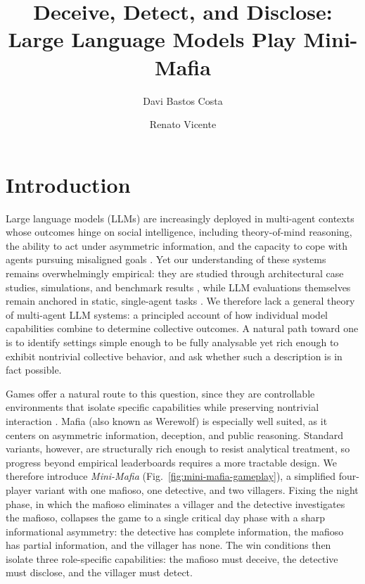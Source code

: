 \documentclass[sigconf]{aamas}
\title{Deceive, Detect, and Disclose: \\ Large Language Models Play Mini-Mafia}
\author{Davi Bastos Costa}
\author{Renato Vicente}
\affiliation{%
  \institution{Center for Artificial Intelligence and Machine Learning, IME, University of S\~ao Paulo}
  \city{S\~ao Paulo}
  \country{Brazil}}
\begin{document}
\pagestyle{fancy}
\fancyhead{}

\maketitle

\section{Introduction}

Large language models (LLMs) are increasingly deployed in multi-agent contexts whose outcomes hinge on social intelligence, including theory-of-mind reasoning, the ability to act under asymmetric information, and the capacity to cope with agents pursuing misaligned goals \citep{gao2024large, guo2024large, wang2024survey}. Yet our understanding of these systems remains overwhelmingly empirical: they are studied through architectural case studies, simulations, and benchmark results \citep{hou2024egosocialarena}, while LLM evaluations themselves remain anchored in static, single-agent tasks \citep{costa2025moralsusceptibilityrobustnesspersona, banerjee2024vulnerability, pan2025benchmarks}. We therefore lack a general theory of multi-agent LLM systems: a principled account of how individual model capabilities combine to determine collective outcomes. A natural path toward one is to identify settings simple enough to be fully analysable yet rich enough to exhibit nontrivial collective behavior, and ask whether such a description is in fact possible.

Games offer a natural route to this question, since they are controllable environments that isolate specific capabilities while preserving nontrivial interaction \citep{silver2016mastering, huizinga1938homo}. Mafia (also known as Werewolf) is especially well suited, as it centers on asymmetric information, deception, and public reasoning. Standard variants, however, are structurally rich enough to resist analytical treatment, so progress beyond empirical leaderboards requires a more tractable design.
We therefore introduce \textit{Mini-Mafia} (Fig.~\ref{fig:mini-mafia-gameplay}), a simplified four-player variant with one mafioso, one detective, and two villagers. Fixing the night phase, in which the mafioso eliminates a villager and the detective investigates the mafioso, collapses the game to a single critical day phase with a sharp informational asymmetry: the detective has complete information, the mafioso has partial information, and the villager has none. The win conditions then isolate three role-specific capabilities: the mafioso must deceive, the detective must disclose, and the villager must detect.
\end{document}
